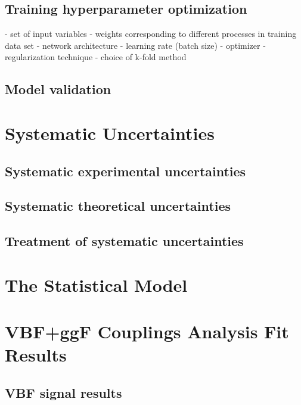 \subsection{Training hyperparameter optimization}

- set of input variables
- weights corresponding to different processes in training data set
- network architecture
- learning rate (batch size)
- optimizer
- regularization technique
- choice of k-fold method
\subsection{Model validation}


\section{Systematic Uncertainties}
\subsection{Systematic experimental uncertainties}
\subsection{Systematic theoretical uncertainties}
\subsection{Treatment of systematic uncertainties}

\section{The Statistical Model}

\section{\HWW VBF+ggF Couplings Analysis Fit Results}
\subsection{VBF signal results}

